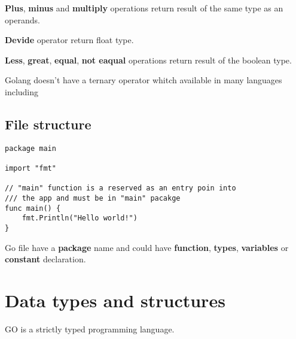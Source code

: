 \documentclass[12pt]{article}
\begin{document}
\begin{paracol}{2}
\begin{leftcolumn}
\end{leftcolumn} \begin{rightcolumn}
\textbf{Plus}, \textbf{minus} and \textbf{multiply} operations return
result of the same type as an operands.

\textbf{Devide} operator return float type.

\textbf{Less}, \textbf{great}, \textbf{equal}, \textbf{not eaqual}
operations return result of the boolean type.

Golang doesn't have a ternary operator whitch available in many
languages including
\end{rightcolumn}
\end{paracol}

\subsection*{File structure}
\begin{paracol}{2}
\begin{leftcolumn}
\begin{lstlisting}
package main

import "fmt"

// "main" function is a reserved as an entry poin into
/// the app and must be in "main" pacakge
func main() {
    fmt.Println("Hello world!")
}
\end{lstlisting}
\end{leftcolumn} \begin{rightcolumn}
Go file have a \textbf{package} name and could have \textbf{function},
\textbf{types}, \textbf{variables} or \textbf{constant} declaration.
\end{rightcolumn}
\end{paracol}

\newpage
\section*{Data types and structures}
\label{sec:data-types-and-structures}
GO is a strictly typed programming language.
\end{document}
